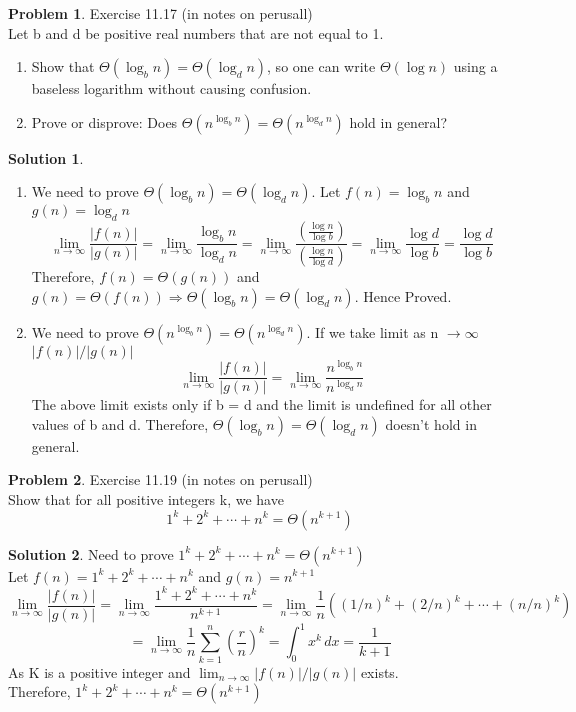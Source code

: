 \documentclass{article}
\theoremstyle{definition}
\newtheorem{problem}{Problem}
\newtheorem*{solution}{Solution}
\begin{document}
\begin{problem}
Exercise 11.17 (in notes on perusall)\\
Let b and d be positive real numbers that are not equal to 1.
\begin{enumerate}[label=(\alph*)]
\item Show that $\Theta(\log_bn) = \Theta(\log_dn)$, so one can write $\Theta(\log{n})$ using a baseless logarithm without causing confusion.
\item Prove or disprove: Does $\Theta({n^{\log_bn}}) = \Theta({n^{\log_dn}})$ hold in general?
\end{enumerate}
\begin{solution}
\begin{enumerate}[label=(\Alph*)]
\item We need to prove $\Theta(\log_bn) = \Theta(\log_dn)$. Let $f(n) = \log_bn$ and $g(n) = \log_dn$
$$\lim_{n\to\infty}\frac{\lvert f(n) \rvert}{\lvert g(n) \rvert} = \lim_{n\to\infty}\frac{\log_b n}{\log_d n} = \lim_{n\to\infty}\frac{(\frac{\log n}{\log b})}{(\frac{\log n}{\log d})} = \lim_{n\to\infty}\frac{\log d}{\log b} = \frac{\log d}{\log b}$$
Therefore, $f(n) = \Theta(g(n))$ and $g(n) = \Theta(f(n)) \Longrightarrow \Theta(\log_bn) = \Theta(\log_dn)$. Hence Proved. 

\item We need to prove $\Theta({n^{\log_bn}}) = \Theta({n^{\log_dn}})$. If we take limit as n $\to\infty$ $\lvert{f(n)}\rvert/\lvert{g(n)}\rvert$
$$\lim_{n\to\infty}\frac{\lvert f(n) \rvert}{\lvert g(n) \rvert} = \lim_{n\to\infty}\frac{n^{\log_bn}}{n^{\log_dn}}$$
The above limit exists only if b = d and the limit is undefined for all other values of b and d. Therefore, $\Theta(\log_bn) = \Theta(\log_dn)$ doesn't hold in general.
\end{enumerate}
\end{solution}
\end{problem}

\begin{problem}
Exercise 11.19 (in notes on perusall) \\
Show that for all positive integers k, we have
$$1^k + 2^k + \cdots + n^k = \Theta(n^{k+1})$$
\begin{solution}
Need to prove $1^k + 2^k + \cdots + n^k = \Theta(n^{k+1})$ \\
Let $f(n) = 1^k + 2^k + \cdots + n^k$ and $g(n) = n^{k+1}$
$$\lim_{n\to\infty}\frac{\lvert f(n) \rvert}{\lvert g(n) \rvert} = \lim_{n\to\infty}\frac{1^k + 2^k + \cdots + n^k}{n^{k+1}} = \lim_{n\to\infty}\frac{1}{n}((1/n)^k + (2/n)^k + \cdots + (n/n)^k)$$
$$= \lim_{n\to\infty}\frac{1}{n}\sum_{k=1}^{n} (\frac{r}{n})^k = \int_{0}^{1} x^k \,dx = \frac{1}{k+1}$$
As K is a positive integer and $\lim_{n\to\infty}{\lvert f(n) \rvert}/{\lvert g(n) \rvert}$ exists. \\ Therefore, $1^k + 2^k + \cdots + n^k = \Theta(n^{k+1})$
\end{solution}
\end{problem}
\end{document}
